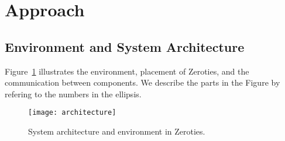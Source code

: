 \section{Approach}
\label{sec:approach}

\subsection{Environment and System Architecture}
\label{sub:architecture}

Figure~\ref{fig:architecture} illustrates the environment, placement of Zeroties, and the communication between components.
We describe the parts in the Figure by refering to the numbers in the ellipsis.

\begin{figure}[h]
    \centering
    \texttt{[image: architecture]}
    \caption{System architecture and environment in Zeroties.}
    \label{fig:architecture}
\end{figure}

